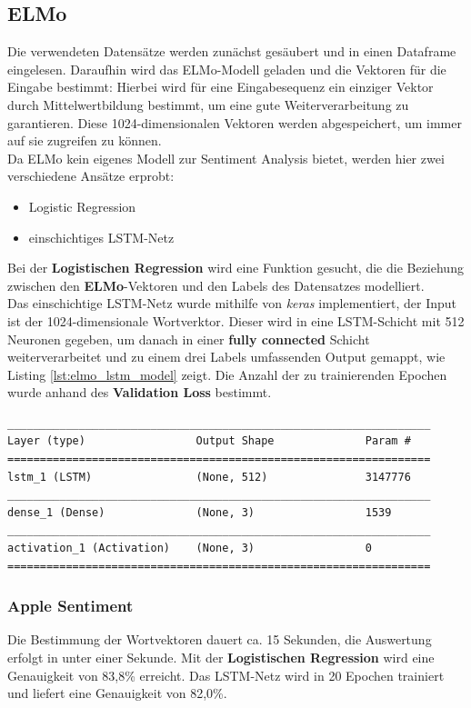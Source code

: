\subsection{ELMo}
Die verwendeten Datens\"atze werden zun\"achst ges\"aubert und in einen Dataframe eingelesen. Daraufhin wird das ELMo-Modell geladen und die Vektoren f\"ur die Eingabe bestimmt: Hierbei wird f\"ur eine Eingabesequenz ein einziger Vektor durch Mittelwertbildung bestimmt, um eine gute Weiterverarbeitung zu garantieren. Diese 1024-dimensionalen Vektoren werden abgespeichert, um immer auf sie zugreifen zu k\"onnen.\\
Da ELMo kein eigenes Modell zur Sentiment Analysis bietet, werden hier zwei verschiedene Ans\"atze erprobt:
\begin{itemize}
\item Logistic Regression
\item einschichtiges LSTM-Netz
\end{itemize}
Bei der \textbf{Logistischen Regression} wird eine Funktion gesucht, die die Beziehung zwischen den \textbf{ELMo}-Vektoren und den Labels des Datensatzes modelliert.\\
Das einschichtige LSTM-Netz wurde mithilfe von \textit{keras} implementiert, der Input ist der 1024-dimensionale Wortverktor. Dieser wird in eine LSTM-Schicht mit 512 Neuronen gegeben, um danach in einer \textbf{fully connected} Schicht weiterverarbeitet und zu einem drei Labels umfassenden Output gemappt, wie Listing \ref{lst:elmo_lstm_model} zeigt. Die Anzahl der zu trainierenden Epochen wurde anhand des \textbf{Validation Loss} bestimmt.
\lstset{language=Python}
\lstset{frame=lines}
\lstset{captionpos=b}
\lstset{basicstyle=\footnotesize}
\begin{lstlisting}
_________________________________________________________________
Layer (type)                 Output Shape              Param #   
=================================================================
lstm_1 (LSTM)                (None, 512)               3147776   
_________________________________________________________________
dense_1 (Dense)              (None, 3)                 1539      
_________________________________________________________________
activation_1 (Activation)    (None, 3)                 0         
=================================================================
\end{lstlisting}

\subsubsection*{Apple Sentiment}
Die Bestimmung der Wortvektoren dauert ca. 15 Sekunden, die Auswertung erfolgt in unter einer Sekunde. Mit der \textbf{Logistischen Regression} wird eine Genauigkeit von 83,8\% erreicht. Das LSTM-Netz wird in 20 Epochen trainiert und liefert eine Genauigkeit von 82,0\%.

